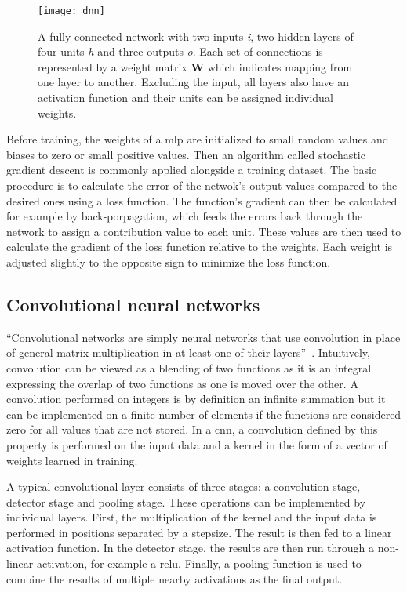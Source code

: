 \begin{figure}[H]
\centering
\texttt{[image: dnn]}
\caption{A fully connected network with two inputs \textit{i}, two hidden layers of
         four units \textit{h} and three outputs \textit{o}. Each set of connections
         is represented by a weight matrix \textbf{W} which indicates mapping from one
         layer to another. Excluding the input, all layers also have an activation
         function and their units can be assigned individual weights.}\label{fig:fcon}
\end{figure}

Before training, the weights of a \ac{mlp} are initialized to small random values and 
biases to zero or small positive values. Then an algorithm called stochastic
gradient descent is commonly applied alongside a training dataset. The basic procedure
is to calculate the error of the netwok's output values compared to the desired ones 
using a loss function. The function's gradient can then be calculated for
example by back-porpagation, which feeds the errors back through the network
to assign a contribution value to each unit. These values are then used to calculate
the gradient of the loss function relative to the weights. Each weight is adjusted
slightly to the opposite sign to minimize the loss function.

\subsection{Convolutional neural networks}\label{ssec:dlcnn}

``Convolutional networks are simply neural networks that use convolution in place of
general matrix multiplication in at least one of their layers''~\cite{DEEP_LEARNING}.
Intuitively, convolution can be viewed as a blending of two functions as it is an
integral expressing the overlap of two functions as one is moved over the other.
A convolution performed on integers is by definition an infinite summation but it
can be implemented on a finite number of elements if the functions are considered
zero for all values that are not stored. In a \ac{cnn}, a convolution defined by this
property is performed on the input data and a kernel in the form of a vector of weights
learned in training.

A typical convolutional layer consists of three stages: a convolution stage, detector
stage and pooling stage. These operations can be implemented by individual layers. First,
the multiplication of the kernel and the input data is performed in positions separated by
a stepsize. The result is then fed to a linear activation function. In the detector stage,
the results are then run through a non-linear activation, for example a \ac{relu}. Finally,
a pooling function is used to combine the results of multiple nearby activations
as the final output.

